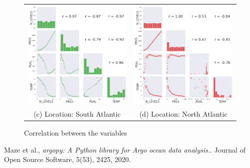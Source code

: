 \documentclass[12pt]{article}
\begin{document}
\begin{figure}[!htb]
\begin{tabular}{cc}
    \hspace{-30pt} \includegraphics[width=70mm]{correlation3.png} &\hspace{10pt}   \includegraphics[width=70mm]{correlation4.png} \\
    (c) Location: South Atlantic & (d) Location: North Atlantic \\[15pt]
    \end{tabular}
    \caption{Correlation between the variables}
    \label{corr}
\end{figure}

\begin{thebibliography}{9}
    Maze et al.,
    \textit{argopy: A Python library for Argo ocean data analysis.}. 
    Journal of Open Source Software, 5(53), 2425, 2020.
\end{thebibliography}
\end{document}
